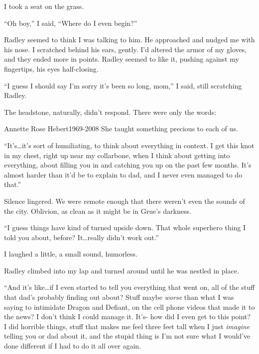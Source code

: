 I took a seat on the grass.



``Oh boy,'' I said, ``Where do I even begin?''



Radley seemed to think I was talking to him.  He approached and nudged me with his nose.  I scratched behind his ears, gently.  I'd altered the armor of my gloves, and they ended more in points.  Radley seemed to like it, pushing against my fingertips, his eyes half-closing.



``I guess I should say I'm sorry it's been so long, mom,'' I said, still scratching Radley.



The headstone, naturally, didn't respond.  There were only the words:



Annette Rose Hebert1969-2008
She taught something precious to each of us.



``It's\ldots it's sort of humiliating, to think about everything in context.  I get this knot in my chest, right up near my collarbone, when I think about getting into everything, about filling you in and catching you up on the past few months.  It's almost harder than it'd be to explain to dad, and I never even managed to do that.''



Silence lingered.  We were remote enough that there weren't even the sounds of the city.  Oblivion, as clean as it might be in Grue's darkness.



``I guess things have kind of turned upside down.  That whole superhero thing I told you about, before?  It\ldots really didn't work out.''



I laughed a little, a small sound, humorless.



Radley climbed into my lap and turned around until he was nestled in place.



``And it's like\ldots if I even started to tell you everything that went on, all of the stuff that dad's probably finding out about?  Stuff maybe \emph{worse} than what I was saying to intimidate Dragon and Defiant, on the cell phone videos that made it to the news?  I don't think I could manage it.  It's- how did I even get to this point?  I did horrible things, stuff that makes me feel three feet tall when I just \emph{imagine }telling you or dad about it, and the stupid thing is I'm not sure what I would've done different if I had to do it all over again.



